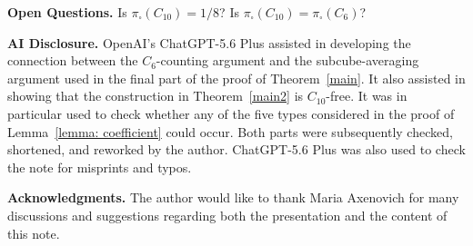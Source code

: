\documentclass[11pt]{article}
\theoremstyle{plain}
\theoremstyle{definition}
\begin{document}
{\bf Open Questions.}
Is $\pi_{\square}(C_{10})=1/8$? 
Is $\pi_{\square}(C_{10})=\pi_{\square}(C_6)$?

{\bf AI Disclosure.}
OpenAI's ChatGPT-5.6 Plus assisted in developing the connection between the $C_6$-counting argument and the subcube-averaging argument used in the final part of the proof of Theorem~\hyperref[proof:main]{\ref*{main}}. 
It also assisted in showing that the construction in Theorem~\ref{main2} is $C_{10}$-free. 
It was in particular used to check whether any of the five types considered in the proof of Lemma~\ref{lemma: coefficient} could occur.
Both parts were subsequently checked, shortened, and reworked by the author. 
ChatGPT-5.6 Plus was also used to check the note for misprints and typos.

{\bf Acknowledgments.}
The author would like to thank Maria Axenovich for many discussions and suggestions regarding both the presentation and the content of this note.
    
\end{document}

